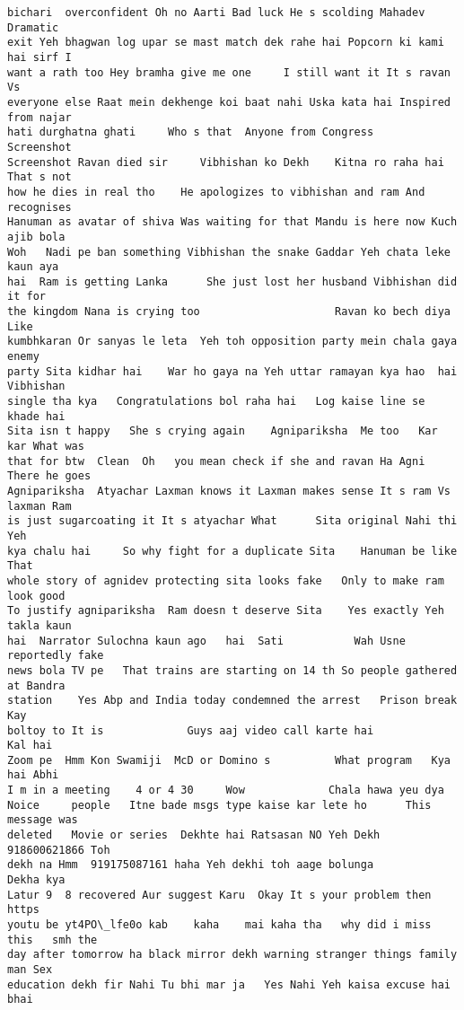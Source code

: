 \documentclass[11pt]{article}
\begin{document}
\begin{tcolorbox}[breakable, size=fbox, boxrule=.5pt, pad at break*=1mm, opacityfill=0]
\begin{Verbatim}[commandchars=\\\{\}]
bichari  overconfident Oh no Aarti Bad luck He s scolding Mahadev      Dramatic
exit Yeh bhagwan log upar se mast match dek rahe hai Popcorn ki kami hai sirf I
want a rath too Hey bramha give me one     I still want it It s ravan Vs
everyone else Raat mein dekhenge koi baat nahi Uska kata hai Inspired from najar
hati durghatna ghati     Who s that  Anyone from Congress        Screenshot
Screenshot Ravan died sir     Vibhishan ko Dekh    Kitna ro raha hai That s not
how he dies in real tho    He apologizes to vibhishan and ram And recognises
Hanuman as avatar of shiva Was waiting for that Mandu is here now Kuch ajib bola
Woh   Nadi pe ban something Vibhishan the snake Gaddar Yeh chata leke kaun aya
hai  Ram is getting Lanka      She just lost her husband Vibhishan did it for
the kingdom Nana is crying too                     Ravan ko bech diya Like
kumbhkaran Or sanyas le leta  Yeh toh opposition party mein chala gaya  enemy
party Sita kidhar hai    War ho gaya na Yeh uttar ramayan kya hao  hai Vibhishan
single tha kya   Congratulations bol raha hai   Log kaise line se khade hai
Sita isn t happy   She s crying again    Agnipariksha  Me too   Kar kar What was
that for btw  Clean  Oh   you mean check if she and ravan Ha Agni There he goes
Agnipariksha  Atyachar Laxman knows it Laxman makes sense It s ram Vs laxman Ram
is just sugarcoating it It s atyachar What      Sita original Nahi thi      Yeh
kya chalu hai     So why fight for a duplicate Sita    Hanuman be like That
whole story of agnidev protecting sita looks fake   Only to make ram look good
To justify agnipariksha  Ram doesn t deserve Sita    Yes exactly Yeh takla kaun
hai  Narrator Sulochna kaun ago   hai  Sati           Wah Usne reportedly fake
news bola TV pe   That trains are starting on 14 th So people gathered at Bandra
station    Yes Abp and India today condemned the arrest   Prison break Kay
boltoy to It is             Guys aaj video call karte hai            Kal hai
Zoom pe  Hmm Kon Swamiji  McD or Domino s          What program   Kya hai Abhi
I m in a meeting    4 or 4 30     Wow             Chala hawa yeu dya
Noice     people   Itne bade msgs type kaise kar lete ho      This message was
deleted   Movie or series  Dekhte hai Ratsasan NO Yeh Dekh  918600621866 Toh
dekh na Hmm  919175087161 haha Yeh dekhi toh aage bolunga         Dekha kya
Latur 9  8 recovered Aur suggest Karu  Okay It s your problem then   https
youtu be yt4PO\_lfe0o kab    kaha    mai kaha tha   why did i miss this   smh the
day after tomorrow ha black mirror dekh warning stranger things family man Sex
education dekh fir Nahi Tu bhi mar ja   Yes Nahi Yeh kaisa excuse hai bhai

\end{Verbatim}
\end{tcolorbox}
\end{document}
